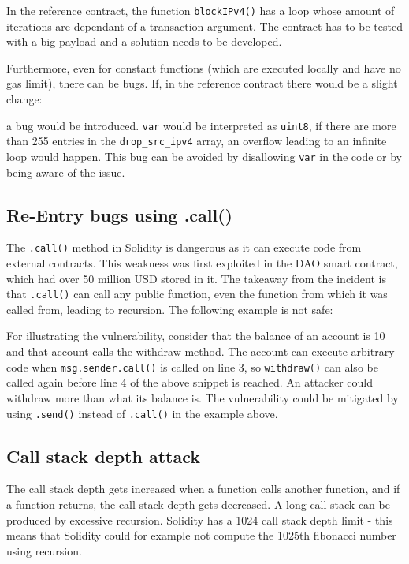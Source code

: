 In the reference contract, the function \texttt{blockIPv4()} has a loop whose amount of iterations are dependant of a transaction argument. The contract has to be tested with a big payload and a solution needs to be developed.

Furthermore, even for constant functions (which are executed locally and have no gas limit), there can be bugs. If, in the reference contract there would be a slight change:



a bug would be introduced. \texttt{var} would be interpreted as \texttt{uint8}, if there are more than 255 entries in the \texttt{drop\_src\_ipv4} array, an overflow leading to an infinite loop would happen.
This bug can be avoided by disallowing \texttt{var} in the code or by being aware of the issue.

\subsection{Re-Entry bugs using .call()}

The \texttt{.call()} method in Solidity is dangerous as it can execute code from external contracts. This weakness was first exploited in the DAO smart contract, which had over 50 million USD stored in it. The takeaway from the incident is that \texttt{.call()} can call any public function, even the function from which it was called from, leading to recursion.
The following example is not safe:



For illustrating the vulnerability, consider that the balance of an account is 10 and that account calls the withdraw method. The account can execute arbitrary code when \texttt{msg.sender.call()} is called on line 3, so \texttt{withdraw()} can also be called again before line 4 of the above snippet is reached. An attacker could withdraw more than what its balance is. The vulnerability could be mitigated by using \texttt{.send()} instead of \texttt{.call()} in the example above.

\subsection{Call stack depth attack}

The call stack depth gets increased when a function calls another function, and if a function returns, the call stack depth gets decreased. A long call stack can be produced by excessive recursion. Solidity has a 1024 call stack depth limit - this means that Solidity could for example not compute the 1025th fibonacci number using recursion.

